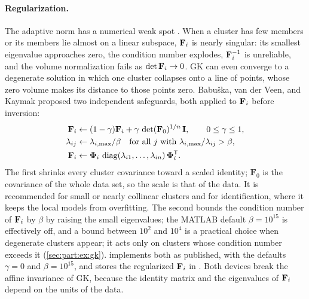 \paragraph{Regularization.} The adaptive norm has a numerical weak spot \cite{babuska:2002:covariance}. When a cluster has few members or its members lie almost on a linear subspace, $\mathbf{F}_i$ is nearly singular: its smallest eigenvalue approaches zero, the condition number explodes, $\mathbf{F}_i^{-1}$ is unreliable, and the volume normalization fails as $\det\mathbf{F}_i\to0$. GK can even converge to a degenerate solution in which one cluster collapses onto a line of points, whose zero volume makes its distance to those points zero. Babu\v{s}ka, van der Veen, and Kaymak proposed two independent safeguards, both applied to $\mathbf{F}_i$ before inversion:
\begin{align}
  \mathbf{F}_i &\leftarrow (1-\gamma)\mathbf{F}_i+\gamma\,\det(\mathbf{F}_0)^{1/n}\,\mathbf{I},\qquad 0\le\gamma\le1, \label{eq:part:gamma}\\
  \lambda_{ij} &\leftarrow \lambda_{i,\max}/\beta\quad\text{for all } j \text{ with } \lambda_{i,\max}/\lambda_{ij}>\beta,\notag\\
  \mathbf{F}_i &\leftarrow\boldsymbol\Phi_i\,\operatorname{diag}(\lambda_{i1},\dots,\lambda_{in})\,\boldsymbol\Phi_i^{\mathsf{T}}. \label{eq:part:beta}
\end{align}
The first shrinks every cluster covariance toward a scaled identity; $\mathbf{F}_0$ is the covariance of the whole data set, so the scale is that of the data. It is recommended for small or nearly collinear clusters and for identification, where it keeps the local models from overfitting. The second bounds the condition number of $\mathbf{F}_i$ by $\beta$ by raising the small eigenvalues; the MATLAB default $\beta=10^{15}$ is effectively off, and a bound between $10^{2}$ and $10^{4}$ is a practical choice when degenerate clusters appear; it acts only on clusters whose condition number exceeds it (\cref{sec:part:ex:gk}).  implements both as published, with the defaults $\gamma=0$ and $\beta=10^{15}$, and stores the regularized $\mathbf{F}_i$ in . Both devices break the affine invariance of GK, because the identity matrix and the eigenvalues of $\mathbf{F}_i$ depend on the units of the data.


